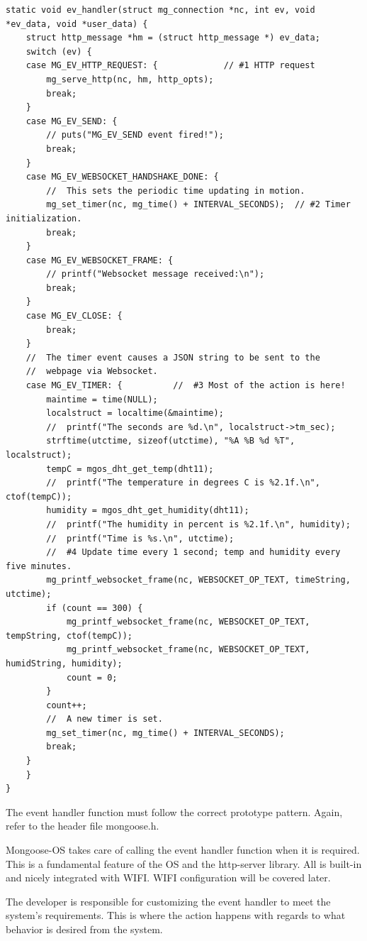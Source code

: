 \documentclass[letterpaper,]{book}
\begin{document}
\begin{verbatim}
static void ev_handler(struct mg_connection *nc, int ev, void *ev_data, void *user_data) {
    struct http_message *hm = (struct http_message *) ev_data;
    switch (ev) {
    case MG_EV_HTTP_REQUEST: {             // #1 HTTP request
        mg_serve_http(nc, hm, http_opts);
        break;
    }
    case MG_EV_SEND: {
        // puts("MG_EV_SEND event fired!");
        break;
    }
    case MG_EV_WEBSOCKET_HANDSHAKE_DONE: {
        //  This sets the periodic time updating in motion.
        mg_set_timer(nc, mg_time() + INTERVAL_SECONDS);  // #2 Timer initialization.
        break;
    }
    case MG_EV_WEBSOCKET_FRAME: {
        // printf("Websocket message received:\n");
        break;
    }
    case MG_EV_CLOSE: {
        break;
    }
    //  The timer event causes a JSON string to be sent to the
    //  webpage via Websocket.
    case MG_EV_TIMER: {          //  #3 Most of the action is here!
        maintime = time(NULL);
        localstruct = localtime(&maintime);
        //  printf("The seconds are %d.\n", localstruct->tm_sec);
        strftime(utctime, sizeof(utctime), "%A %B %d %T", localstruct);
        tempC = mgos_dht_get_temp(dht11);
        //  printf("The temperature in degrees C is %2.1f.\n", ctof(tempC));
        humidity = mgos_dht_get_humidity(dht11);
        //  printf("The humidity in percent is %2.1f.\n", humidity);
        //  printf("Time is %s.\n", utctime);
        //  #4 Update time every 1 second; temp and humidity every five minutes.
        mg_printf_websocket_frame(nc, WEBSOCKET_OP_TEXT, timeString, utctime);
        if (count == 300) {
            mg_printf_websocket_frame(nc, WEBSOCKET_OP_TEXT, tempString, ctof(tempC));
            mg_printf_websocket_frame(nc, WEBSOCKET_OP_TEXT, humidString, humidity);
            count = 0;
        }
        count++;
        //  A new timer is set.
        mg_set_timer(nc, mg_time() + INTERVAL_SECONDS);
        break;
    }
    }
}
\end{verbatim}

The event handler function must follow the correct prototype pattern.
Again, refer to the header file mongoose.h.

Mongoose-OS takes care of calling the event handler function when it is
required. This is a fundamental feature of the OS and the http-server
library. All is built-in and nicely integrated with WIFI. WIFI
configuration will be covered later.

The developer is responsible for customizing the event handler to meet
the system's requirements. This is where the action happens with regards
to what behavior is desired from the system.
\end{document}
